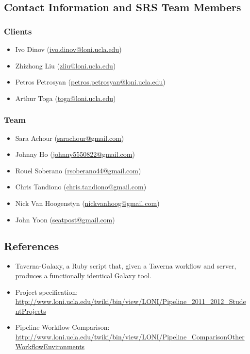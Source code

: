 \documentclass[12pt]{article}
\begin{document}
\subsection{Contact Information and SRS Team Members}
\subsubsection{Clients}
\begin{itemize}
\item Ivo Dinov (\href{mailto:ivo.dinov@loni.ucla.edu}{ivo.dinov@loni.ucla.edu})
\item Zhizhong Liu (\href{mailto:zliu@loni.ucla.edu}{zliu@loni.ucla.edu})
\item Petros Petrosyan (\href{mailto:petros.petrosyan@loni.ucla.edu}{petros.petrosyan@loni.ucla.edu})
\item Arthur Toga (\href{mailto:toga@loni.ucla.edu}{toga@loni.ucla.edu})
\end{itemize}


\subsubsection{Team}
\begin{itemize}
\item Sara Achour (\href{mailto:sarachour@gmail.com}{sarachour@gmail.com})
\item Johnny Ho (\href{mailto:johnny5550822@gmail.com}{johnny5550822@gmail.com})
\item Rouel Soberano (\href{mailto:rsoberano44@gmail.com}{rsoberano44@gmail.com})
\item Chris Tandiono (\href{mailto:chris.tandiono@gmail.com}{chris.tandiono@gmail.com})
\item Nick Van Hoogenstyn (\href{mailto:nickvanhoog@gmail.com}{nickvanhoog@gmail.com})
\item John Yoon (\href{mailto:seatpost@gmail.com}{seatpost@gmail.com})
\end{itemize}


\subsection{References}
\begin{itemize}
\item Taverna-Galaxy, a Ruby script that, given a Taverna workflow and server, produces a functionally identical Galaxy tool.
\item Project specification: \url{http://www.loni.ucla.edu/twiki/bin/view/LONI/Pipeline_2011_2012_StudentProjects}
\item Pipeline Workflow Comparison: \url{http://www.loni.ucla.edu/twiki/bin/view/LONI/Pipeline_ComparisonOtherWorkflowEnvironments}
\end{itemize}
\end{document}
